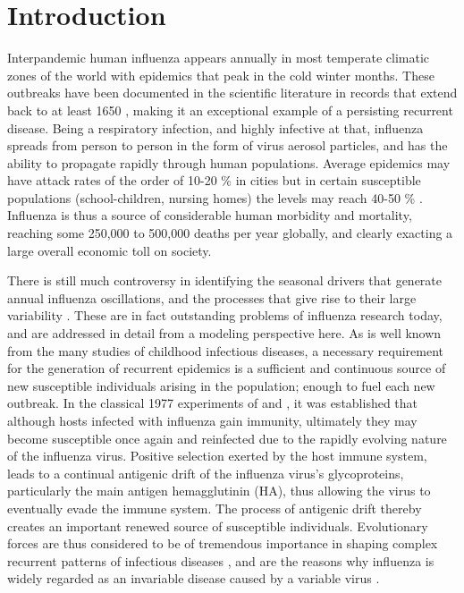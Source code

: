 \documentclass[12pt]{article}
\begin{document}
\section{Introduction}
\label{sec:introduction}

Interpandemic human influenza appears annually in most temperate
climatic zones of the world with epidemics that peak in the cold
winter months. These outbreaks have been documented in the scientific
literature in records that extend back to at least 1650
\citep{Potter2001}, making it an exceptional example of a persisting
recurrent disease.  Being a respiratory infection, and highly
infective at that, influenza spreads from person to person in the form
of virus aerosol particles, and has the ability to propagate rapidly
through human populations. Average epidemics may have attack rates of
the order of 10-20 \% in cities but in certain susceptible populations
(school-children, nursing homes) the levels may reach 40-50 \%
\citep{Cox2000a}.  Influenza is thus a source of considerable human
morbidity and mortality, reaching some 250,000 to 500,000 deaths per
year globally, and clearly exacting a large overall economic toll on
society.

There is still much controversy in identifying the seasonal drivers
that generate annual influenza oscillations, and the processes that
give rise to their large variability \citep{Finkelman2007}. These are
in fact outstanding problems of influenza research today, and are
addressed in detail from a modeling perspective here. As is well known
from the many studies of childhood infectious diseases, a necessary
requirement for the generation of recurrent epidemics is a sufficient
and continuous source of new susceptible individuals arising in the
population; enough to fuel each new outbreak. In the classical 1977
experiments of \citet{Potter1977} and \citet{Gill1977}, it was
established that although hosts infected with influenza gain immunity,
ultimately they may become susceptible once again and reinfected due
to the rapidly evolving nature of the influenza virus.  Positive
selection exerted by the host immune system, leads to a continual
antigenic drift of the influenza virus's glycoproteins, particularly
the main antigen hemagglutinin (HA), thus allowing the virus to
eventually evade the immune system.  The process of antigenic drift
thereby creates an important renewed source of susceptible
individuals.  Evolutionary forces are thus considered to be of
tremendous importance in shaping complex recurrent patterns of
infectious diseases \citep{Cobey2008}, and are the reasons why
influenza is widely regarded as an invariable disease caused by a
variable virus \citep{Potter2001}.
\end{document}
